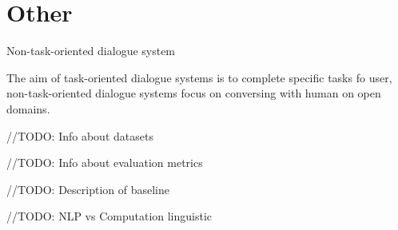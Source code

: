 \chapter{Other}

Non-task-oriented dialogue system

The aim of task-oriented dialogue systems is to complete specific tasks fo user, non-task-oriented dialogue systems focus on conversing with human on open domains. 

//TODO: Info about datasets

//TODO: Info about evaluation metrics

//TODO: Description of baseline

//TODO: NLP vs Computation linguistic

